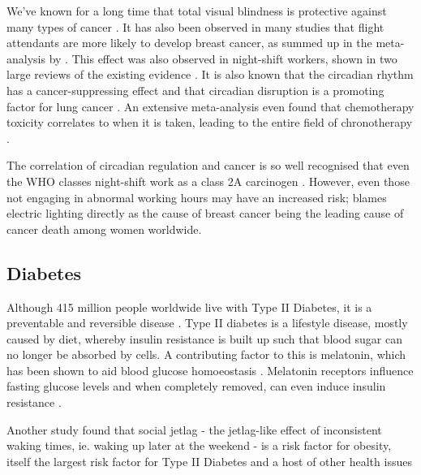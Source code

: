 We've known for a long time that total visual blindness is protective against many types of cancer \citep{hahnProfoundBilateralBlindness1991, feychtingReducedCancerIncidence1998, flynn-evansTotalVisualBlindness2009}. It has also been observed in many studies that flight attendants are more likely to develop breast cancer, as summed up in the meta-analysis by \citet{tokumaruIncidenceCancerFemale2006}. This effect was also observed in night-shift workers, shown in two large reviews of the existing evidence \citep{kolstadNightshiftWorkRisk2008, stevensLightatnightCircadianDisruption2009}. It is also known that the circadian rhythm has a cancer-suppressing effect \citep{fuCircadianClockPacemaker2003} and that circadian disruption is a promoting factor for lung cancer \citep{papagiannakopoulosCircadianRhythmDisruption2016}. An extensive meta-analysis even found that chemotherapy toxicity correlates to when it is taken, leading to the entire field of chronotherapy \citep{focanCircadianRhythmsCancer1995, dallmannChronopharmacologyNewInsights2014}.

The correlation of circadian regulation and cancer is so well recognised that even the WHO classes night-shift work as a class 2A carcinogen \citep{whoBreastCancerConundrum2013}. However, even those not engaging in abnormal working hours may have an increased risk; \citet{stevensBreastCancerCircadian2014} blames electric lighting directly as the cause of breast cancer being the leading cause of cancer death among women worldwide.


\subsection{Diabetes}

Although 415 million people worldwide live with Type II Diabetes, it is a preventable and reversible disease \citep{fungDiabetesCodePrevent2018}. Type II diabetes is a lifestyle disease, mostly caused by diet, whereby insulin resistance is built up such that blood sugar can no longer be absorbed by cells. A contributing factor to this is melatonin, which has been shown to aid blood glucose homoeostasis \citep{bouatia-najiVariantMTNR1BAssociated2009}. Melatonin receptors influence fasting glucose levels \citep{prokopenkoVariantsMTNR1BInfluence2009} and when completely removed, can even induce insulin resistance \citep{contreras-alcantaraRemovalMelatoninReceptor2010}.

Another study found that social jetlag - the jetlag-like effect of inconsistent waking times, ie. waking up later at the weekend - is a risk factor for obesity, itself the largest risk factor for Type II Diabetes and a host of other health issues \citep{roennebergSocialJetlagObesity2012}

